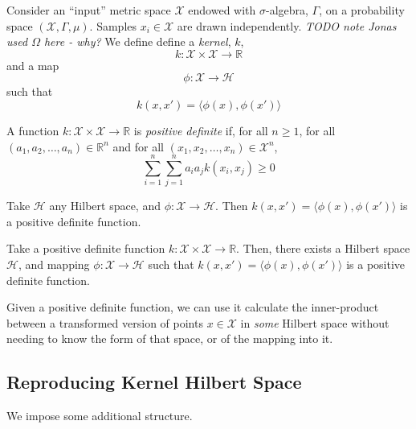 Consider an ``input'' metric space $\mathcal{X}$ endowed with $\sigma$-algebra, $\Gamma$,
on a probability space $(\mathcal{X}, \Gamma, \mu)$.
Samples $x_i \in \mathcal{X}$ are drawn independently.
\emph{TODO note Jonas used $\Omega$ here - why?}
\clearpage
We define define a \emph{kernel}, $k$,
\begin{equation*}
k : \mathcal{X} \times \mathcal{X} \rightarrow \mathbb{R}
\end{equation*}
and a map
\begin{equation}
\phi: \mathcal{X} \rightarrow \mathcal{H}
\end{equation}
such that 
\begin{equation*}
k(x, x') = \langle \phi(x), \phi(x') \rangle
\end{equation*}
\clearpage
\begin{defn}
A function $k:\mathcal{X} \times \mathcal{X}\rightarrow \mathbb{R}$ is \emph{positive definite} if,
for all $n \ge 1$,
for all $(a_1, a_2, \ldots, a_n) \in \mathbb{R}^n$ and
for all $(x_1, x_2, \ldots, x_n) \in \mathcal{X}^n$,
\begin{equation*}
\sum_{i=1}^n\sum_{j=1}^n a_i a_j k(x_i, x_j) \ge 0
\end{equation*}
\end{defn}
\clearpage
\begin{fact}
Take $\mathcal{H}$ any Hilbert space, and $\phi: \mathcal{X} \rightarrow \mathcal{H}$. Then  $k(x, x') = \langle \phi(x), \phi(x') \rangle$ is a positive definite function.
\end{fact}
\clearpage
\begin{fact}
Take a positive definite function $k : \mathcal{X} \times \mathcal{X} \rightarrow \mathbb{R}$.
Then, there exists a Hilbert space $\mathcal{H}$, and mapping $\phi: \mathcal{X} \rightarrow \mathcal{H}$ such that 
 $k(x, x') = \langle \phi(x), \phi(x') \rangle$ is a positive definite function.
\end{fact}
\clearpage
Given a positive definite function, we can use it calculate the inner-product between a transformed version of points $x \in \mathcal{X}$ in \emph{some} Hilbert space without needing to know the form of that space, or of the mapping into it.
\clearpage
\subsection{Reproducing Kernel Hilbert Space}
We impose some additional structure.

